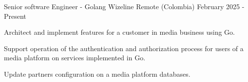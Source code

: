 

\begin{cventries}

\cventry
{Senior software Engineer - Golang} %
{Wizeline} %
{Remote (Colombia)} %
{February 2025 - Present} %
{
  \begin{cvitems} %
    \item {Architect and implement features for a customer in media business using Go.}
    \item {Support operation of the authentication and authorization process for users of a media platform on services implemented in Go.}
    \item {Update partners configuration on a media platform databases.}
  \end{cvitems}
}


\end{cventries}
